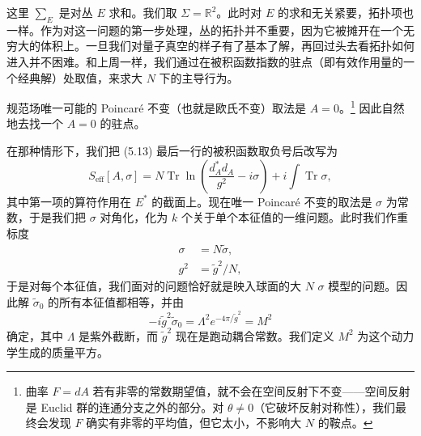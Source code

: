 这里 $\sum_E$ 是对丛 $E$ 求和。我们取 $\Sigma=\mathbb{R}^2$。此时对 $E$ 的求和无关紧要，拓扑项也一样。作为对这一问题的第一步处理，丛的拓扑并不重要，因为它被摊开在一个无穷大的体积上。一旦我们对量子真空的样子有了基本了解，再回过头去看拓扑如何进入并不困难。和上周一样，我们通过在被积函数指数的驻点（即有效作用量的一个经典解）处取值，来求大 $N$ 下的主导行为。

规范场唯一可能的 Poincaré 不变（也就是欧氏不变）取法是 $A=0$。\footnote{曲率 $F=dA$ 若有非零的常数期望值，就不会在空间反射下不变——空间反射是 Euclid 群的连通分支之外的部分。对 $\theta\neq0$（它破坏反射对称性），我们最终会发现 $F$ 确实有非零的平均值，但它太小，不影响大 $N$ 的鞍点。} 因此自然地去找一个 $A=0$ 的驻点。


在那种情形下，我们把 (5.13) 最后一行的被积函数取负号后改写为
\[
  S_{\mathrm{eff}}[A,\sigma]=N\operatorname{Tr}\ln\left(\frac{d_A^*d_A}{g^2}-i\sigma\right)+i\int\operatorname{Tr}\sigma,
\]
其中第一项的算符作用在 $E^*$ 的截面上。现在唯一 Poincaré 不变的取法是 $\sigma$ 为常数，于是我们把 $\sigma$ 对角化，化为 $k$ 个关于单个本征值的一维问题。此时我们作重标度
\begin{equation}
  \tag{5.14}
  \label{eq:5-14}
  \begin{aligned}
    \sigma&=N\tilde\sigma,\\
    g^2&=\tilde{g}^2/N,
  \end{aligned}
\end{equation}
于是对每个本征值，我们面对的问题恰好就是映入球面的大 $N$ $\sigma$ 模型的问题。因此解 $\tilde\sigma_0$ 的所有本征值都相等，并由
\[
  -i\tilde{g}^2\tilde\sigma_0=\Lambda^2e^{-4\pi/\tilde{g}^2}=M^2
\]
确定，其中 $\Lambda$ 是紫外截断，而 $\tilde{g}^2$ 现在是跑动耦合常数。我们定义 $M^2$ 为这个动力学生成的质量平方。


